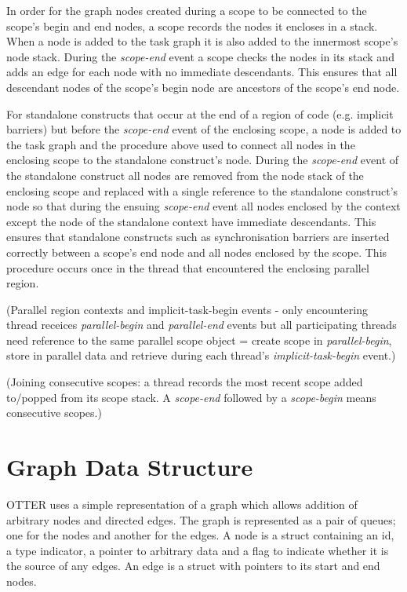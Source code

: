\documentclass[11pt,a4paper]{article}
\begin{document}
In order for the graph nodes created during a scope to be connected to the scope's begin and end nodes, a scope records the nodes it encloses in a stack. When a node is added to the task graph it is also added to the innermost scope's node stack. During the \emph{scope-end} event a scope checks the nodes in its stack and adds an edge for each node with no immediate descendants. This ensures that all descendant nodes of the scope's begin node are ancestors of the scope's end node.

For standalone constructs that occur at the end of a region of code (e.g. implicit barriers) but before the \emph{scope-end} event of the enclosing scope, a node is added to the task graph and the procedure above used to connect all nodes in the enclosing scope to the standalone construct's node. During the \emph{scope-end} event of the standalone construct all nodes are removed from the node stack of the enclosing scope and replaced with a single reference to the standalone construct's node so that during the ensuing \emph{scope-end} event all nodes enclosed by the context except the node of the standalone context have immediate descendants. This ensures that standalone constructs such as synchronisation barriers are inserted correctly between a scope's end node and all nodes enclosed by the scope. This procedure occurs once in the thread that encountered the enclosing parallel region.

(Parallel region contexts and implicit-task-begin events - only encountering thread receices \emph{parallel-begin} and \emph{parallel-end} events but all participating threads need reference to the same parallel scope object = create scope in \emph{parallel-begin}, store in parallel data and retrieve during each thread's \emph{implicit-task-begin} event.)

(Joining consecutive scopes: a thread records the most recent scope added to/popped from its scope stack. A \emph{scope-end} followed by a \emph{scope-begin} means consecutive scopes.)



\section{Graph Data Structure}

OTTER uses a simple representation of a graph which allows addition of arbitrary nodes and directed edges. The graph is represented as a pair of queues; one for the nodes and another for the edges. A node is a struct containing an id, a type indicator, a pointer to arbitrary data and a flag to indicate whether it is the source of any edges. An edge is a struct with pointers to its start and end nodes.
\end{document}
